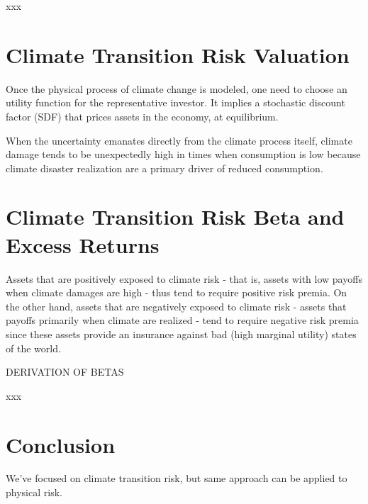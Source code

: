 \begin{tcolorbox}[colback=white, colframe=black, title=Example X]
    xxx
\end{tcolorbox}


\section{Climate Transition Risk Valuation}

Once the physical process of climate change is modeled,
one need to choose an utility function for the representative 
investor. It implies a stochastic discount factor (SDF)
that prices assets in the economy, at equilibrium. 

When the uncertainty emanates directly from the climate process 
itself, climate damage tends to be unexpectedly high in times 
when consumption is low because climate disaster realization 
are a primary driver of reduced consumption. 

\section{Climate Transition Risk Beta and Excess Returns}

Assets that are positively exposed to climate risk - that is, 
assets with low payoffs when climate damages are high -
thus tend to require positive risk premia. On the other hand, 
assets that are negatively exposed to climate risk - 
assets that payoffs primarily when climate are realized - 
tend to require negative risk premia since these assets 
provide an insurance against bad (high marginal utility)
states of the world. 

DERIVATION OF BETAS

\begin{tcolorbox}[colback=white, colframe=black, title=Example X]
    xxx
\end{tcolorbox}


\section{Conclusion}

We've focused on climate transition risk, but same approach 
can be applied to physical risk. 

    
